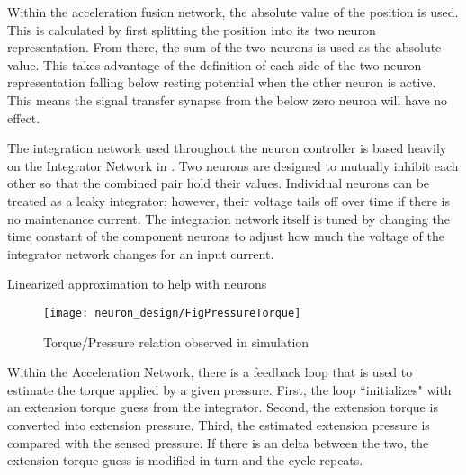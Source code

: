 

Within the acceleration fusion network, the absolute value of the position is
used. This is calculated by first splitting the position into its two neuron
representation. From there, the sum of the two neurons is used as the absolute
value. This takes advantage of the definition of each side of the two neuron
representation falling below resting potential when the other neuron is active.
This means the signal transfer synapse from the below zero neuron will have no
effect.



The integration network used throughout the neuron controller is based heavily
on the Integrator Network in \cite{NickFunctionalSubnetwork}. Two neurons are
designed to mutually inhibit each other so that the combined pair hold their
values. Individual neurons can be treated as a leaky integrator; however, their
voltage tails off over time if there is no maintenance current. The integration
network itself is tuned by changing the time constant of the component neurons
to adjust how much the voltage of the integrator network changes for an input
current.


Linearized approximation to help with neurons

\begin{figure}[h!]
\centering
\texttt{[image: neuron\_design/FigPressureTorque]}
\caption{Torque/Pressure relation observed in simulation}
\label{fig:PressureTorque}
\end{figure}


Within the Acceleration Network, there is a feedback loop that is used to 
estimate the torque applied by a given pressure. First, the loop ``initializes"
with an extension torque guess from the integrator. Second, the extension
torque is converted into extension pressure. Third, the estimated extension
pressure is compared with the sensed pressure. If there is an delta between the
two, the extension torque guess is modified in turn and the cycle repeats.

